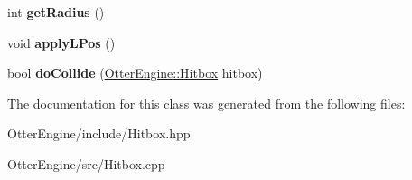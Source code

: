 \begin{DoxyCompactItemize}
\item 
int {\bfseries get\+Radius} ()\hypertarget{class_otter_engine_1_1_hitbox_a0917d3b8702a30219d90353cdc363a76}{}\label{class_otter_engine_1_1_hitbox_a0917d3b8702a30219d90353cdc363a76}

\item 
void {\bfseries apply\+L\+Pos} ()\hypertarget{class_otter_engine_1_1_hitbox_aafd3d91d01d9d8572484683f625dbab9}{}\label{class_otter_engine_1_1_hitbox_aafd3d91d01d9d8572484683f625dbab9}

\item 
bool {\bfseries do\+Collide} (\hyperlink{class_otter_engine_1_1_hitbox}{Otter\+Engine\+::\+Hitbox} hitbox)\hypertarget{class_otter_engine_1_1_hitbox_a5e390bca853bd22fa784a4583fcbd527}{}\label{class_otter_engine_1_1_hitbox_a5e390bca853bd22fa784a4583fcbd527}

\end{DoxyCompactItemize}


The documentation for this class was generated from the following files\+:\begin{DoxyCompactItemize}
\item 
Otter\+Engine/include/Hitbox.\+hpp\item 
Otter\+Engine/src/Hitbox.\+cpp\end{DoxyCompactItemize}
